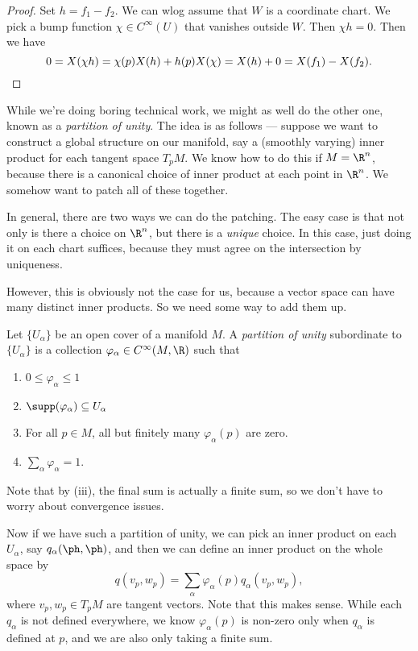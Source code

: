 \documentclass[a4paper]{article}
\begin{document}
\begin{proof}
  Set $h = f_1 - f_2$. We can wlog assume that $W$ is a coordinate chart. We pick a bump function $\chi \in C^\infty(U)$ that vanishes outside $W$. Then $\chi h = 0$. Then we have
  \[
    0 = X(\chi h) = \chi(p) X(h) + h(p) X(\chi) = X(h) + 0 = X(f_1) - X(f_2). \qedhere
  \]
\end{proof}

While we're doing boring technical work, we might as well do the other one, known as a \emph{partition of unity}. The idea is as follows --- suppose we want to construct a global structure on our manifold, say a (smoothly varying) inner product for each tangent space $T_p M$. We know how to do this if $M = \R^n$, because there is a canonical choice of inner product at each point in $\R^n$. We somehow want to patch all of these together.

In general, there are two ways we can do the patching. The easy case is that not only is there a choice on $\R^n$, but there is a \emph{unique} choice. In this case, just doing it on each chart suffices, because they must agree on the intersection by uniqueness.

However, this is obviously not the case for us, because a vector space can have many distinct inner products. So we need some way to add them up.

\begin{defi}
  Let $\{U_\alpha\}$ be an open cover of a manifold $M$. A \emph{partition of unity} subordinate to $\{U_\alpha\}$ is a collection $\varphi_\alpha \in C^\infty(M, \R)$ such that
  \begin{enumerate}
    \item $0 \leq \varphi_\alpha \leq 1$
    \item $\supp(\varphi_\alpha) \subseteq U_\alpha$
    \item For all $p \in M$, all but finitely many $\varphi_\alpha(p)$ are zero.
    \item $\sum_\alpha \varphi_\alpha = 1$.
  \end{enumerate}
\end{defi}
Note that by (iii), the final sum is actually a finite sum, so we don't have to worry about convergence issues.

Now if we have such a partition of unity, we can pick an inner product on each $U_\alpha$, say $q_\alpha(\ph, \ph)$, and then we can define an inner product on the whole space by
\[
  q(v_p, w_p) = \sum_{\alpha} \varphi_{\alpha}(p) q_\alpha(v_p, w_p),
\]
where $v_p, w_p \in T_p M$ are tangent vectors. Note that this makes sense. While each $q_\alpha$ is not defined everywhere, we know $\varphi_\alpha(p)$ is non-zero only when $q_\alpha$ is defined at $p$, and we are also only taking a finite sum.
\end{document}
